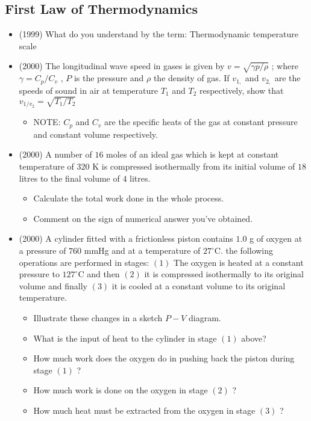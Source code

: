 \documentclass{article}
\begin{document}
\subsection{First Law of Thermodynamics}
\begin{itemize}
\item (1999)  What do you understand by the term: Thermodynamic temperature scale
\item (2000)  The longitudinal wave speed in gases is given by $ v=\sqrt{\gamma p/ \rho }$ ; where $ \gamma =C_{p}/C_{v}$ , $ P$ is the pressure and $ \rho $ the density of gas. If $ v_{1,}$ and $ v_{2,}$ are the speeds of sound in air at temperature $ T_{1}$ and $ T_{2}$ respectively, show that $ v_{1/v_2}=\sqrt{T_{1}/T_{2}}$\begin{itemize}
\item NOTE: $ C_{p}$ and $ C_{v}$ are the specific heats of the gas at constant pressure and constant volume respectively.
\end{itemize}
\item (2000)  A number of $ 16$ moles of an ideal gas which is kept at constant temperature of $ 320$ K is compressed isothermally from its initial volume of $ 18$ litres to the final volume of $ 4$ litres.\begin{itemize}
\item Calculate the total work done in the whole process.
\item Comment on the sign of numerical answer you've obtained.
\end{itemize}
\item (2000)  A cylinder fitted with a frictionless piston contains $ 1.0$ g of oxygen at a pressure of $ 760$ mmHg and at a temperature of $ 27^{\circ}$C. the following operations are performed in stages: $ (1)$ The oxygen is heated at a constant pressure to $ 127^{\circ}$C and then $ (2)$ it is compressed isothermally to its original volume and finally $ (3)$ it is cooled at a constant volume to its original temperature.\begin{itemize}
\item Illustrate these changes in a sketch $ P-V$ diagram.
\item What is the input of heat to the cylinder in stage $ (1)$ above?
\item How much work does the oxygen do in pushing back the piston during stage $ (1)$ ?
\item How much work is done on the oxygen in stage $ (2)$ ?
\item How much heat must be extracted from the oxygen in stage $ (3)$ ? 

\end{itemize}
\end{itemize}
\end{document}
